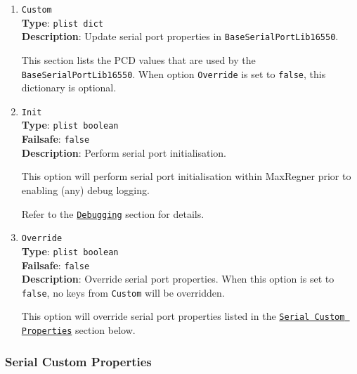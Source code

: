 \documentclass[]{article}
\begin{document}
\begin{enumerate}

\item
  \texttt{Custom}\\
  \textbf{Type}: \texttt{plist\ dict}\\
  \textbf{Description}: Update serial port properties in \texttt{BaseSerialPortLib16550}.

  This section lists the PCD values that are used by the \texttt{BaseSerialPortLib16550}.
  When option \texttt{Override} is set to \texttt{false}, this dictionary is optional.

\item
  \texttt{Init}\\
  \textbf{Type}: \texttt{plist\ boolean}\\
  \textbf{Failsafe}: \texttt{false}\\
  \textbf{Description}: Perform serial port initialisation.

  This option will perform serial port initialisation within MaxRegner prior to enabling
  (any) debug logging.

  Refer to the \hyperref[troubleshootingdebug]{\texttt{Debugging}} section for details.

\item
  \texttt{Override}\\
  \textbf{Type}: \texttt{plist\ boolean}\\
  \textbf{Failsafe}: \texttt{false}\\
  \textbf{Description}: Override serial port properties.
  When this option is set to \texttt{false}, no keys from \texttt{Custom} will be overridden.

  This option will override serial port properties listed in the \hyperref[miscserialcustprops]{\texttt{Serial Custom Properties}}
  section below.

\end{enumerate}

\subsubsection{Serial Custom Properties}\label{miscserialcustprops}
\end{document}
